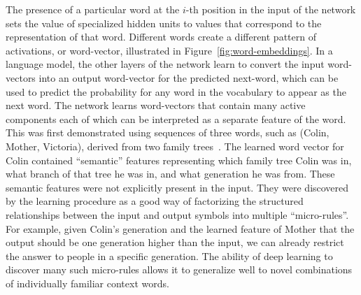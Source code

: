 \documentclass[10pts]{article}
\begin{document}
The presence of a particular word at the $i$-th position in the input
of the network sets the value of specialized hidden units to values
that correspond to the representation of that word. Different words
create a different pattern of activations, or word-vector, illustrated
in Figure~\ref{fig:word-embeddings}.  In a language model, the other
layers of the network learn to convert the input word-vectors into an
output word-vector for the predicted next-word, which can be used to
predict the probability for any word in the vocabulary to appear as
the next word.  The network learns word-vectors that contain many
active components each of which can be interpreted as a separate
feature of the word. This was first demonstrated using sequences of
three words, such as (Colin, Mother, Victoria), derived from two
family trees~\citep{RHW}. The learned word vector for Colin contained
``semantic'' features representing which family tree Colin was in,
what branch of that tree he was in, and what generation he was from.
These semantic features were not explicitly present
in the input.  They were discovered by the learning procedure as a good way
of factorizing the structured relationships between the input and output
symbols into multiple ``micro-rules''.  For example, given Colin's
generation and the learned feature of Mother that the output should be one
generation higher than the input, we can already restrict the answer to
people in a specific generation. The ability of deep learning to discover
many such micro-rules allows it to generalize well to novel combinations of
individually familiar context words.
\end{document}
